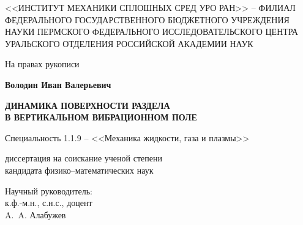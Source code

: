 \documentclass[12pt,a4paper]{article}
\begin{document}
	

\begin{center}
	\thispagestyle{empty}
	\small <<ИНСТИТУТ МЕХАНИКИ СПЛОШНЫХ СРЕД УРО РАН>> – ФИЛИАЛ \\
	\small ФЕДЕРАЛЬНОГО ГОСУДАРСТВЕННОГО БЮДЖЕТНОГО УЧРЕЖДЕНИЯ \\
	\small НАУКИ ПЕРМСКОГО ФЕДЕРАЛЬНОГО ИССЛЕДОВАТЕЛЬСКОГО ЦЕНТРА \\
	\small УРАЛЬСКОГО ОТДЕЛЕНИЯ РОССИЙСКОЙ АКАДЕМИИ НАУК \\
\end{center}

\vspace{3em}

\begin{flushright}
	{    На правах рукописи}
\end{flushright}

\vspace{3em}

\begin{center}
	\textbf{Володин Иван Валерьевич}\\
\end{center}

\begin{center}
	\textbf{ДИНАМИКА ПОВЕРХНОСТИ РАЗДЕЛА\\ В ВЕРТИКАЛЬНОМ ВИБРАЦИОННОМ ПОЛЕ}\\
\end{center}

\begin{center}
	Специальность 1.1.9 – <<Механика жидкости, газа и плазмы>> \\
\end{center}

\vspace{2em}

\begin{center}
	диссертация на соискание ученой степени \\
	кандидата физико--математических наук \\
\end{center}



\vspace{3em}

\begin{flushright}
	{    Научный руководитель:\\
		к.ф.-м.н., с.н.с., доцент\\
		A.\, A. Алабужев\\\underline{\hspace{100pt}\hspace{10pt}}\\
		\vspace{\fill}}
\end{flushright}
\end{document}

